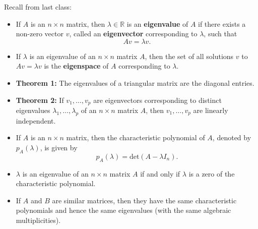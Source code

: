 \documentclass[12pt,letterpaper]{article}
\begin{document}
\thispagestyle{fancy}

Recall from last class:

\begin{itemize}
\item If $A$ is an $n \times n$ matrix, then $\lambda \in \mathbb{R}$ is an {\bf eigenvalue} of $A$ if there exists a non-zero vector $v$, called an {\bf eigenvector} corresponding to $\lambda$, such that $$Av=\lambda v.$$
\item If $\lambda$ is an eigenvalue of an $n \times n$ matrix $A$, then the set of all solutions $v$ to $Av = \lambda v$ is the {\bf eigenspace} of $A$ corresponding to $\lambda$.
\item {\bf Theorem 1:} The eigenvalues of a triangular matrix are the diagonal entries.
\item {\bf Theorem 2:} If $v_1, \dots, v_p$ are eigenvectors corresponding to distinct eigenvalues $\lambda_1, \dots, \lambda_p$ of an $n\times n$ matrix $A$, then $v_1, \dots, v_p$ are linearly independent.
\item If $A$ is an $n\times n$ matrix, then the characteristic polynomial of $A$, denoted by $p_A(\lambda)$, is given by $$p_A(\lambda)=\text{det}(A-\lambda I_n).$$
\item $\lambda$ is an eigenvalue of an $n\times n$ matrix $A$ if and only if $\lambda$ is a zero of the characteristic polynomial.
\item If $A$ and $B$ are similar matrices, then they have the same characteristic polynomials and hence the same eigenvalues (with the same algebraic multiplicities). 
\end{itemize}

\newpage
\end{document}
